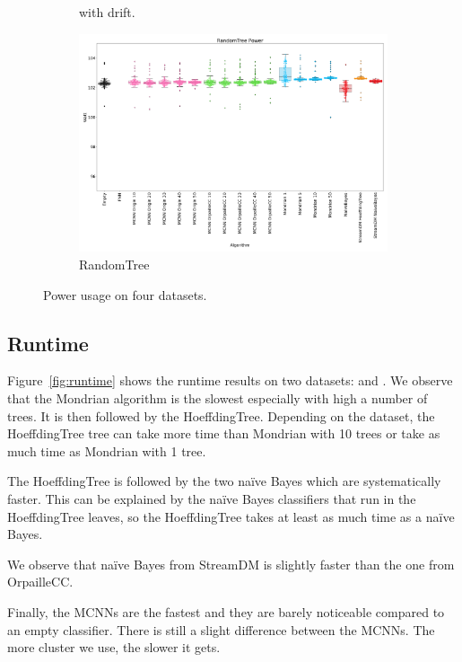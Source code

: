 \begin{figure}
\begin{subfigure}[t]{.5\linewidth}
		\caption{\banosdataset with drift.}
		\label{fig:power-drift}
	\end{subfigure}
	\begin{subfigure}[t]{.5\linewidth}
		\includegraphics[width=\linewidth]{figures/results/dataset_3_watt.png}
		\caption{RandomTree}
		\label{fig:power-dataset_3}
	\end{subfigure}
	\caption{Power usage on four datasets.}
	\label{fig:power}
\end{figure}

\subsection{Runtime}
Figure~\ref{fig:runtime} shows the runtime results on two datasets:
\banosdataset and \recofitdataset. We observe that the Mondrian algorithm is
the slowest especially with high a number of trees.
It is then followed by the HoeffdingTree. Depending on the dataset, the
HoeffdingTree tree can take more time than Mondrian with 10 trees or take as
much time as Mondrian with 1 tree.

The HoeffdingTree is followed by the two naïve Bayes which are systematically
faster.  This can be explained by the naïve Bayes classifiers that run in the HoeffdingTree
leaves, so the HoeffdingTree takes at least as much time as a naïve Bayes.

We observe that naïve Bayes from StreamDM is slightly faster than the one from
OrpailleCC.

Finally, the MCNNs are the fastest and they are barely noticeable compared to an
empty classifier. There is still a slight difference between the MCNNs. The
more cluster we use, the slower it gets.

